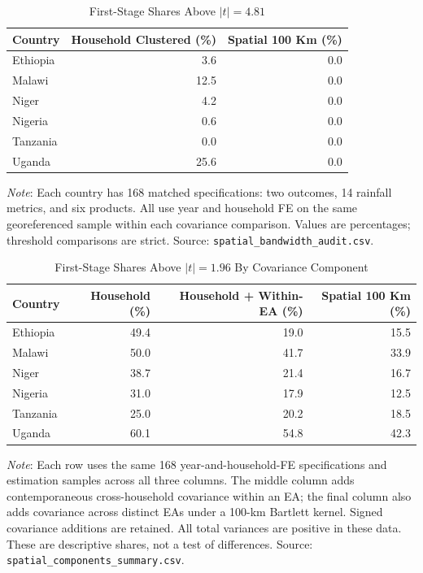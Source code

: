 
\begin{table}[!htbp]
	\centering
	\caption{First-Stage Shares Above $|t|=4.81$}
	\label{app:space_481}
	\begin{tabular}{lrr}
		\hline
		Country & Household Clustered (\%) & Spatial 100 Km (\%) \\
		\hline
		Ethiopia & 3.6 & 0.0 \\
		Malawi & 12.5 & 0.0 \\
		Niger & 4.2 & 0.0 \\
		Nigeria & 0.6 & 0.0 \\
		Tanzania & 0.0 & 0.0 \\
		Uganda & 25.6 & 0.0 \\
		\hline
	\end{tabular}
	\par\smallskip
	\begin{minipage}{.95\linewidth}
		\footnotesize \textit{Note}: Each country has 168 matched specifications:
		two outcomes, 14 rainfall metrics, and six products. All use year and
		household FE on the same georeferenced sample within each covariance
		comparison. Values are percentages; threshold comparisons are strict.
		Source: \texttt{spatial\_bandwidth\_audit.csv}.
	\end{minipage}
\end{table}

\begin{table}[!htbp]
	\centering
	\caption{First-Stage Shares Above $|t|=1.96$ By Covariance Component}
	\label{app:space_components}
	\begin{tabular}{lrrr}
		\hline
		Country & Household (\%) & Household + Within-EA (\%) & Spatial 100 Km (\%) \\
		\hline
		Ethiopia & 49.4 & 19.0 & 15.5 \\
		Malawi & 50.0 & 41.7 & 33.9 \\
		Niger & 38.7 & 21.4 & 16.7 \\
		Nigeria & 31.0 & 17.9 & 12.5 \\
		Tanzania & 25.0 & 20.2 & 18.5 \\
		Uganda & 60.1 & 54.8 & 42.3 \\
		\hline
	\end{tabular}
	\par\smallskip
	\begin{minipage}{.95\linewidth}
		\footnotesize \textit{Note}: Each row uses the same 168 year-and-household-FE
		specifications and estimation samples across all three columns. The middle
		column adds contemporaneous cross-household covariance within an EA;
		the final column also adds covariance across distinct EAs under a 100-km
		Bartlett kernel. Signed covariance additions are retained. All total
		variances are positive in these data. These are descriptive shares,
		not a test of differences. Source: \texttt{spatial\_components\_summary.csv}.
	\end{minipage}
\end{table}

